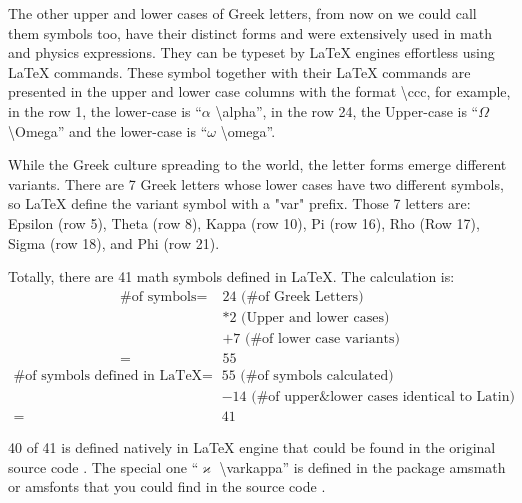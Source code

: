 \documentclass{pensee}
\begin{document}
The other upper and lower cases of Greek letters, from now on we could call them symbols too, have their distinct forms and were extensively used in math and physics expressions. They can be typeset by LaTeX engines effortless using LaTeX commands. These symbol together with their LaTeX commands are presented in the upper and lower case columns with the format \textcolor{cmdcolor}{\textbackslash ccc}, for example, in the row 1, the lower-case is \enquote{$\alpha$ \textcolor{cmdcolor}{\textbackslash alpha}}, in the row 24, the Upper-case is \enquote{$\Omega$ \textcolor{cmdcolor}{\textbackslash Omega}} and the lower-case is  \enquote{$\omega$ \textcolor{cmdcolor}{\textbackslash omega}}.

While the Greek culture spreading to the world, the letter forms emerge different variants. There are 7 Greek letters whose lower cases have two different symbols, so LaTeX define the variant symbol with a "var" prefix. Those 7 letters are: Epsilon (row 5), Theta (row 8), Kappa (row 10), Pi (row 16), Rho (Row 17), Sigma (row 18), and Phi (row 21).

Totally, there are 41 math symbols defined in LaTeX. The calculation is:
\begin{align*}
	\text{\# of symbols} = \;&24 \text{ (\# of Greek Letters)} \\
										 &*2 \text{ (Upper and lower cases)} \\
										 &+7 \text{ (\# of lower case variants)} \\
										 =\;&55 
\end{align*}
\begin{align*}
	\text{\# of symbols defined in LaTeX} = \;& 55 \text{ (\# of symbols calculated)} \\
											& -14 \text{ (\# of upper\&lower cases identical to Latin)}\\
											 =\;&41 
\end{align*}
 
 40 of 41 is defined natively in LaTeX engine that could be found in the original source code \cite{latex2e:fontdef.dtx:2025}. The special one \enquote{$\varkappa$ \textcolor{cmdcolor}{\textbackslash varkappa}} is defined in the package amsmath or amsfonts that you could find in the source code \cite{ams:amssymb.dtx}.





\printbibliography
\end{document}
